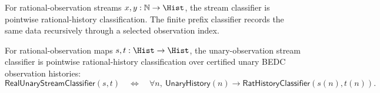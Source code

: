 \begin{definition}
\label{def:real-stream-classifiers}
For rational-observation streams $x,y:\mathbb{N}\to\Hist$, the stream classifier is pointwise rational-history classification. The finite prefix classifier records the same data recursively through a selected observation index.
\end{definition}

\begin{definition}
\label{def:real-unary-observation-stream-classifier}
For rational-observation maps $s,t:\Hist\to\Hist$, the unary-observation
stream classifier is pointwise rational-history classification over certified
unary BEDC observation histories:
$$
\mathsf{RealUnaryStreamClassifier}(s,t)
\quad\Longleftrightarrow\quad
\forall n,\ \mathsf{UnaryHistory}(n)\to
\mathsf{RatHistoryClassifier}(s(n),t(n)).
$$
\end{definition}

